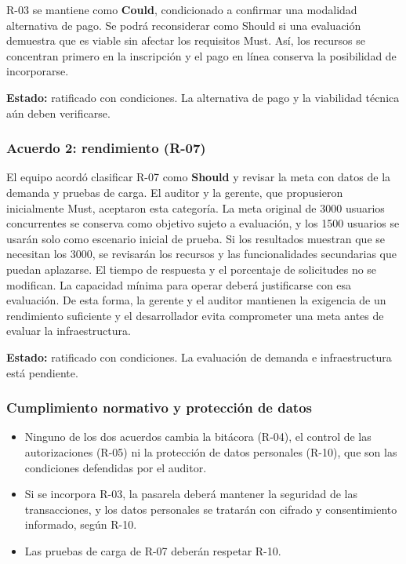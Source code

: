 \documentclass[12pt,a4paper]{article}
\begin{document}
R-03 se mantiene como \textbf{Could}, condicionado a
confirmar una modalidad alternativa de pago. Se podrá
reconsiderar como Should si una evaluación demuestra que
es viable sin afectar los requisitos Must. Así, los
recursos se concentran primero en la inscripción y el
pago en línea conserva la posibilidad de incorporarse.

\textbf{Estado:} ratificado con condiciones. La
alternativa de pago y la viabilidad técnica aún deben
verificarse.

\subsubsection{Acuerdo 2: rendimiento (R-07)}

El equipo acordó clasificar R-07 como \textbf{Should} y
revisar la meta con datos de la demanda y pruebas de
carga. El auditor y la gerente, que propusieron
inicialmente Must, aceptaron esta categoría. La meta
original de 3000 usuarios concurrentes se conserva como
objetivo sujeto a evaluación, y los 1500 usuarios se
usarán solo como escenario inicial de prueba. Si los
resultados muestran que se necesitan los 3000, se
revisarán los recursos y las funcionalidades secundarias
que puedan aplazarse. El tiempo de respuesta y el
porcentaje de solicitudes no se modifican. La capacidad
mínima para operar deberá justificarse con esa
evaluación. De esta forma, la gerente y el auditor
mantienen la exigencia de un rendimiento suficiente y el
desarrollador evita comprometer una meta antes de evaluar
la infraestructura.

\textbf{Estado:} ratificado con condiciones. La
evaluación de demanda e infraestructura está pendiente.

\subsubsection{Cumplimiento normativo y protección de datos}

\begin{itemize}[leftmargin=1.5em]

    \item Ninguno de los dos acuerdos cambia la bitácora
    (R-04), el control de las autorizaciones (R-05) ni la
    protección de datos personales (R-10), que son las
    condiciones defendidas por el auditor.

    \item Si se incorpora R-03, la pasarela deberá
    mantener la seguridad de las transacciones, y los
    datos personales se tratarán con cifrado y
    consentimiento informado, según R-10.

    \item Las pruebas de carga de R-07 deberán respetar
    R-10.

\end{itemize}
\end{document}
